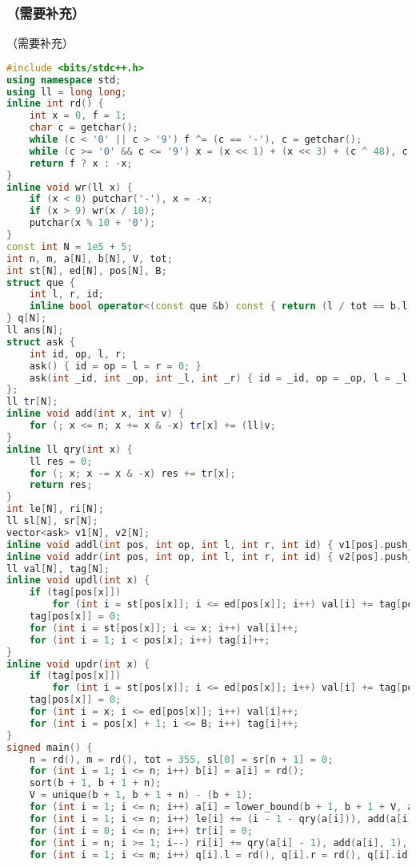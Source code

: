 \documentclass[9pt, a4paper, oneside]{book}
\begin{document}
\subsubsection{（需要补充）}
（需要补充）
\begin{lstlisting}[language={C++}]
#include <bits/stdc++.h>
using namespace std;
using ll = long long;
inline int rd() {
    int x = 0, f = 1;
    char c = getchar();
    while (c < '0' || c > '9') f ^= (c == '-'), c = getchar();
    while (c >= '0' && c <= '9') x = (x << 1) + (x << 3) + (c ^ 48), c = getchar();
    return f ? x : -x;
}
inline void wr(ll x) {
    if (x < 0) putchar('-'), x = -x;
    if (x > 9) wr(x / 10);
    putchar(x % 10 + '0');
}
const int N = 1e5 + 5;
int n, m, a[N], b[N], V, tot;
int st[N], ed[N], pos[N], B;
struct que {
    int l, r, id;
    inline bool operator<(const que &b) const { return (l / tot == b.l / tot) ? r < b.r : l < b.l; }
} q[N];
ll ans[N];
struct ask {
    int id, op, l, r;
    ask() { id = op = l = r = 0; }
    ask(int _id, int _op, int _l, int _r) { id = _id, op = _op, l = _l, r = _r; }
};
ll tr[N];
inline void add(int x, int v) {
    for (; x <= n; x += x & -x) tr[x] += (ll)v;
}
inline ll qry(int x) {
    ll res = 0;
    for (; x; x -= x & -x) res += tr[x];
    return res;
}
int le[N], ri[N];
ll sl[N], sr[N];
vector<ask> v1[N], v2[N];
inline void addl(int pos, int op, int l, int r, int id) { v1[pos].push_back(ask(id, op, l, r)); }
inline void addr(int pos, int op, int l, int r, int id) { v2[pos].push_back(ask(id, op, l, r)); }
ll val[N], tag[N];
inline void updl(int x) {
    if (tag[pos[x]])
        for (int i = st[pos[x]]; i <= ed[pos[x]]; i++) val[i] += tag[pos[x]];
    tag[pos[x]] = 0;
    for (int i = st[pos[x]]; i <= x; i++) val[i]++;
    for (int i = 1; i < pos[x]; i++) tag[i]++;
}
inline void updr(int x) {
    if (tag[pos[x]])
        for (int i = st[pos[x]]; i <= ed[pos[x]]; i++) val[i] += tag[pos[x]];
    tag[pos[x]] = 0;
    for (int i = x; i <= ed[pos[x]]; i++) val[i]++;
    for (int i = pos[x] + 1; i <= B; i++) tag[i]++;
}
signed main() {
    n = rd(), m = rd(), tot = 355, sl[0] = sr[n + 1] = 0;
    for (int i = 1; i <= n; i++) b[i] = a[i] = rd();
    sort(b + 1, b + 1 + n);
    V = unique(b + 1, b + 1 + n) - (b + 1);
    for (int i = 1; i <= n; i++) a[i] = lower_bound(b + 1, b + 1 + V, a[i]) - b;
    for (int i = 1; i <= n; i++) le[i] += (i - 1 - qry(a[i])), add(a[i], 1), sl[i] = sl[i - 1] + le[i];
    for (int i = 0; i <= n; i++) tr[i] = 0;
    for (int i = n; i >= 1; i--) ri[i] += qry(a[i] - 1), add(a[i], 1), sr[i] = sr[i + 1] + ri[i];
    for (int i = 1; i <= m; i++) q[i].l = rd(), q[i].r = rd(), q[i].id = i;

\end{lstlisting}
\end{document}
